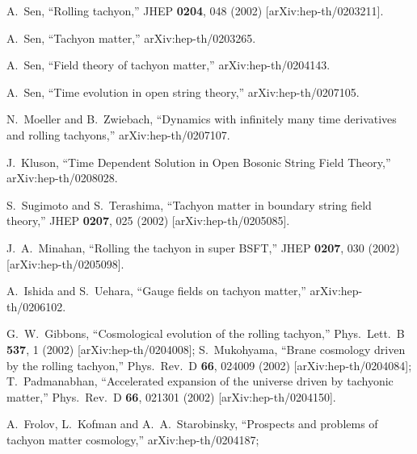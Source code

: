 \documentclass[a4paper,12pt]{article} \textheight=8.5truein
\begin{document}
\renewcommand{\baselinestretch}{0.87}

\begingroup\raggedright\begin{thebibliography}{10}

A.~Sen,
``Rolling tachyon,''
JHEP {\bf 0204}, 048 (2002)
[arXiv:hep-th/0203211].

A.~Sen,
``Tachyon matter,''
arXiv:hep-th/0203265.

A.~Sen,
``Field theory of tachyon matter,''
arXiv:hep-th/0204143.

A.~Sen,
``Time evolution in open string theory,''
arXiv:hep-th/0207105.

N.~Moeller and B.~Zwiebach, ``Dynamics with infinitely many time
derivatives and rolling tachyons,'' arXiv:hep-th/0207107.

J.~Kluson, ``Time Dependent Solution in Open Bosonic String Field
Theory,'' arXiv:hep-th/0208028.

S.~Sugimoto and S.~Terashima,
``Tachyon matter in boundary string field theory,''
JHEP {\bf 0207}, 025 (2002)
[arXiv:hep-th/0205085].

J.~A.~Minahan,
``Rolling the tachyon in super BSFT,''
JHEP {\bf 0207}, 030 (2002)
[arXiv:hep-th/0205098].

A.~Ishida and S.~Uehara, ``Gauge fields on tachyon matter,''
arXiv:hep-th/0206102.

G.~W.~Gibbons, ``Cosmological evolution of the rolling tachyon,''
Phys.\ Lett.\ B {\bf 537}, 1 (2002) [arXiv:hep-th/0204008];
S.~Mukohyama, ``Brane cosmology driven by the rolling tachyon,''
Phys.\ Rev.\ D {\bf 66}, 024009 (2002) [arXiv:hep-th/0204084];
T.~Padmanabhan,
``Accelerated expansion of the universe driven by tachyonic matter,''
Phys.\ Rev.\ D {\bf 66}, 021301 (2002)
[arXiv:hep-th/0204150].

A.~Frolov, L.~Kofman and A.~A.~Starobinsky, ``Prospects and
problems of tachyon matter cosmology,'' arXiv:hep-th/0204187;



\end{thebibliography}
\end{document}
